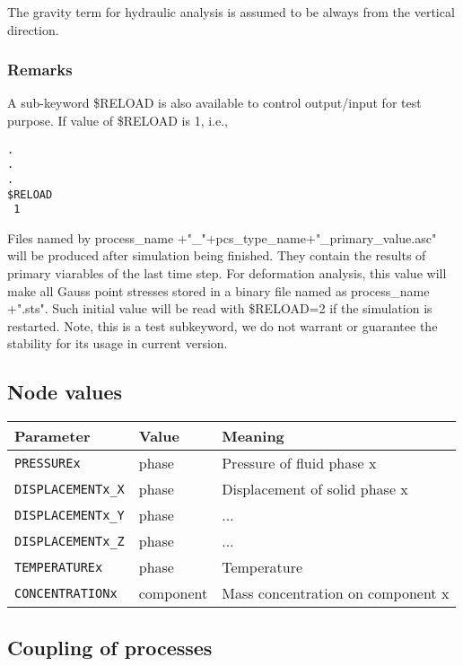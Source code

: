 The gravity term for hydraulic analysis is assumed to be always from
 the vertical direction. %


\subsubsection{Remarks}
A sub-keyword \mbox{\$RELOAD} is also available to control output/input for test purpose. If value of \mbox{\$RELOAD} is 1, i.e.,
\begin{verbatim}
.
.
.
$RELOAD
 1
\end{verbatim}
Files named by process\_name +"\_"+pcs\_type\_name+"\_primary\_value.asc" will be produced after simulation being finished.
They contain the results of primary viarables of the last time step. For deformation analysis, this value will make
  all Gauss point stresses stored in a binary file named as  process\_name +".sts".  Such initial value will
   be read with \mbox{\$RELOAD=2} if the simulation is restarted. Note, this is a test subkeyword,
    we do not warrant or guarantee the stability for its usage in current version.



\subsection{Node values}
\label{sec:nod_values}

\begin{tabular*}{12.773cm}{|p{}|p{1.5cm}|p{7cm}|} \hline
Parameter          & Value & Meaning \\ \hline \hline
%
\texttt{PRESSUREx}        & phase & Pressure of fluid phase x \\
\texttt{DISPLACEMENTx\_X} & phase & Displacement of solid phase x \\
\texttt{DISPLACEMENTx\_Y} & phase & ... \\
\texttt{DISPLACEMENTx\_Z} & phase & ... \\
\texttt{TEMPERATUREx}     & phase & Temperature \\
\texttt{CONCENTRATIONx}   & component & Mass concentration on component x \\
\hline
\end{tabular*}

\subsection{Coupling of processes}
